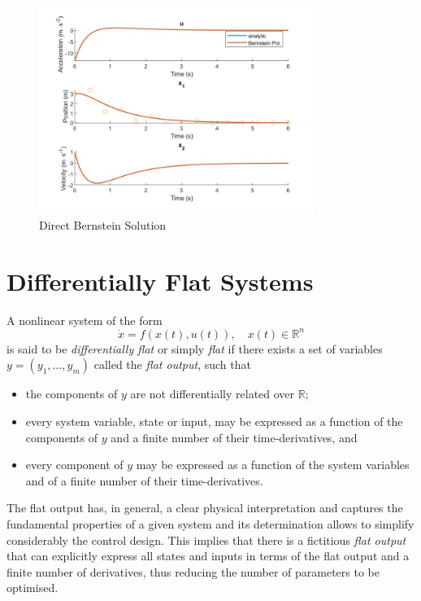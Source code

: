 \begin{figure}[h!]
\centering
\includegraphics[width=0.8\textwidth]{Images/bernstein_1d.jpg}
\caption{Direct Bernstein Solution}
\label{fig:bernstein_1d}
\end{figure}

\section{Differentially Flat Systems}
\label{sec:differentiallyflatsystems}

\par A nonlinear system of the form
\begin{equation}
    \dot{x} = f(x(t),u(t)), \quad x(t) \in \mathbb{R}^n
\end{equation}
is said to be \textit{differentially flat} \cite{fliess1995flatness} or simply \textit{flat} if there exists a set of variables $y = (y_1, \dots, y_m)$ called the \textit{flat output}, such that
\begin{itemize}
    \item the components of $y$ are not differentially related over $\mathbb{R}$;
    \item every system variable, state or input, may be expressed as a function of the components of $y$ and a finite number of their time-derivatives, and 
    \item every component of $y$ may be expressed as a function of the system variables and of a finite number of their time-derivatives. 
\end{itemize}

\par The flat output has, in general, a clear physical interpretation and captures the fundamental properties of a given system and its determination allows to simplify considerably the control design. This implies that there is a fictitious \textit{flat output} that can explicitly express all states and inputs in terms of the flat output and a finite number of derivatives, thus reducing the number of parameters to be optimised.



